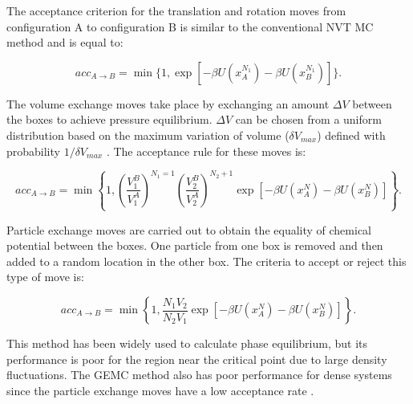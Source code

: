 The acceptance criterion for the translation and rotation moves from configuration A    to configuration B is similar to the conventional NVT MC method and is equal to:

\begin{equation}
acc_{A \rightarrow B} = \min \lbrace 1,\exp[-\beta U(x_{A}^{N_{1}}) -\beta U(x_{B}^{N_{1}})] \rbrace .
\label{eqn:drprob}
\end{equation} 

The volume exchange moves take place by exchanging an amount $\Delta V$ between the boxes to achieve pressure equilibrium. $\Delta V$ can be chosen from a uniform distribution based on the maximum variation of volume ($\delta V_{max}$) defined with probability $1/\delta V_{max}$ \cite{frenkel}. The acceptance rule for these moves is: 

\begin{equation}
acc_{A \rightarrow B} = \min \left \lbrace 1, \left(\dfrac{V_{1}^{B}}{V_{1}^{A}} \right)^{N_{1}=1} \left( \dfrac{V_{2}^{B}}{V_{2}^{A}} \right)^{N_{2}+1} \exp[-\beta U(x_{A}^{N}) -\beta U(x_{B}^{N})] \right \rbrace .
\label{vprob}
\end{equation}

Particle exchange moves are carried out to obtain the equality of chemical potential between the boxes. One particle from one box is removed and then added to a random location in the other box. The criteria to accept or reject this type of move is:

\begin{equation}
acc_{A \rightarrow B} = \min \left \lbrace 1, \dfrac{N_{1}V_{2}}{N_{2}V_{1}}  \exp[-\beta U(x_{A}^{N}) -\beta U(x_{B}^{N})] \right \rbrace .
\label{moleprob}
\end{equation}

This method has been widely used to calculate phase equilibrium, but its performance is poor for the region near the critical point due to large density fluctuations. The GEMC method also has poor performance for dense systems since the particle exchange moves have a low acceptance rate \cite{978-94-017-0765-7}.  






